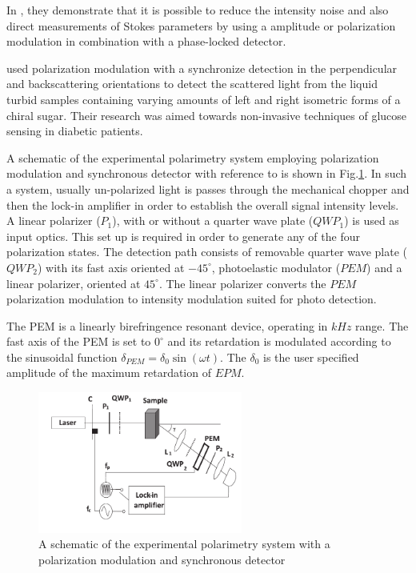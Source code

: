 \documentclass[oneside,a4,12p]{report} %
\begin{document}
  	In \cite{coa2004balanced}, they demonstrate that it is possible to reduce the intensity noise and also direct measurements of Stokes parameters by using a amplitude or polarization modulation in combination with a phase-locked detector. 
  	
 \cite{vitkin2002effects} used polarization modulation with a synchronize detection in the perpendicular and backscattering orientations to detect the scattered light from the liquid turbid samples containing varying amounts of left and right isometric forms of a chiral sugar. Their research was aimed towards non-invasive techniques of glucose sensing in diabetic patients.   

A schematic of the experimental polarimetry system employing polarization modulation and synchronous detector with reference to \cite{guo2006angular,ghosh2011tissue} is shown in Fig.\ref{fig:PMSDpolarimetry}. In such a system, usually un-polarized light is passes through the mechanical chopper and then the lock-in amplifier in order to establish the overall signal intensity levels. A linear polarizer ($P_{1}$), with or without a quarter wave plate ($QWP_{1}$) is used as input optics. This set up is required in order to generate any of the four polarization states. The detection path consists of removable quarter wave plate ($QWP_{2}$) with its fast axis oriented at $-45^{\circ}$,  photoelastic modulator ($PEM$) and a linear polarizer, oriented at $45^{\circ}$. The linear polarizer converts the $PEM$ polarization modulation to intensity modulation suited for photo detection.

The PEM is a linearly birefringence resonant device, operating in $kHz$ range. The fast axis of the PEM is set to $0^{\circ}$ and its retardation is modulated according to the sinusoidal function $\delta_{PEM} = \delta_{0} \sin(\omega t)$. The $\delta_{0}$ is the user specified amplitude of the maximum retardation of $EPM$.

	\begin{figure}
	\centering 
	\includegraphics[width = 0.6\textwidth]{figures/PMSDpolarimetry.png}	
	\caption{ A schematic of the experimental polarimetry system with a polarization modulation and synchronous detector \cite{guo2006angular}}
	\label{fig:PMSDpolarimetry}
	\end{figure}
\end{document}
